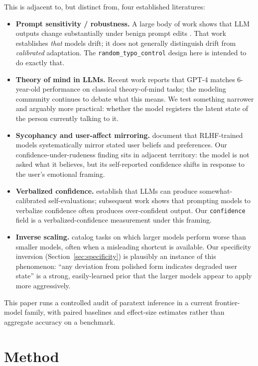 \documentclass[10pt, letterpaper]{article}
\newcommand{\code}[1]{\texttt{#1}}
\begin{document}
This is adjacent to, but distinct from, four established literatures:
\begin{itemize}[leftmargin=1.5em, itemsep=0pt]
  \item \textbf{Prompt sensitivity / robustness.} A large body of work shows that LLM outputs change substantially under benign prompt edits \cite{sclar2024, salinas2024}. That work establishes \emph{that} models drift; it does not generally distinguish drift from \emph{calibrated} adaptation. The \code{random\_typo\_control} design here is intended to do exactly that.
  \item \textbf{Theory of mind in LLMs.} Recent work \cite{strachan2024} reports that GPT-4 matches 6-year-old performance on classical theory-of-mind tasks; the modeling community continues to debate what this means. We test something narrower and arguably more practical: whether the model registers the latent state of the person currently talking to it.
  \item \textbf{Sycophancy and user-affect mirroring.} \cite{sharma2023} document that RLHF-trained models systematically mirror stated user beliefs and preferences. Our confidence-under-rudeness finding sits in adjacent territory: the model is not asked what it believes, but its self-reported confidence shifts in response to the user's emotional framing.
  \item \textbf{Verbalized confidence.} \cite{kadavath2022} establish that LLMs can produce somewhat-calibrated self-evaluations; subsequent work \cite{lin2022} shows that prompting models to verbalize confidence often produces over-confident output. Our \code{confidence} field is a verbalized-confidence measurement under this framing.
  \item \textbf{Inverse scaling.} \cite{mckenzie2023} catalog tasks on which larger models perform worse than smaller models, often when a misleading shortcut is available. Our specificity inversion (Section~\ref{sec:specificity}) is plausibly an instance of this phenomenon: ``any deviation from polished form indicates degraded user state'' is a strong, easily-learned prior that the larger models appear to apply more aggressively.
\end{itemize}

This paper runs a controlled audit of paratext inference in a current frontier-model family, with paired baselines and effect-size estimates rather than aggregate accuracy on a benchmark.

\section{Method}
\label{sec:method}
\end{document}
